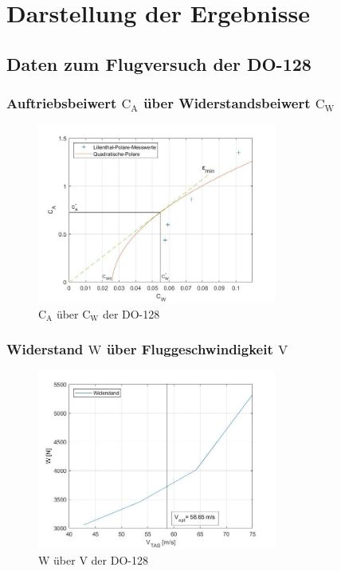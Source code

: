 \chapter{Darstellung der Ergebnisse}
\label{c:Ergebnisse}

\section{Daten zum Flugversuch der DO-128}

\subsection{Auftriebsbeiwert $\mathrm{C}_{\mathrm{A}}$ über Widerstandsbeiwert $\mathrm{C}_{\mathrm{W}}$}

\begin{figure}[H]
	\centering	\includegraphics[width=0.7\textwidth]{./Bilder/CA_CW_fertig.jpg}
	\caption{$\mathrm{C}_{\mathrm{A}}$ über $\mathrm{C}_{\mathrm{W}}$ der DO-128}
	\label{fig:CA_CW_DO128}
\end{figure}

\subsection{Widerstand $\mathrm{W}$ über Fluggeschwindigkeit $\mathrm{V}$}

\begin{figure}[H]
	\centering	\includegraphics[width=0.7\textwidth]{./Bilder/W_uber_V.jpg}
	\caption{$\mathrm{W}$ über $\mathrm{V}$ der DO-128}
	\label{fig:W_V_DO128}
\end{figure}

